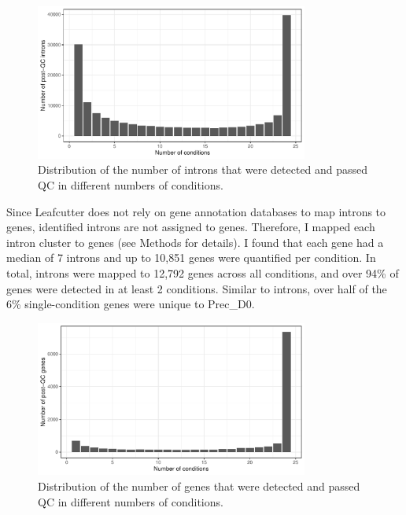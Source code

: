 \begin{figure}[H]
  \centering
  \includegraphics[width=0.8\textwidth]{dist_intron_num}
  \caption{Distribution of the number of introns that were detected and passed QC in different numbers of conditions.}
  \label{fig:dist_intron_num}   
\end{figure}
Since Leafcutter does not rely on gene annotation databases to map introns to genes, identified introns are not assigned to genes. Therefore, I mapped each intron cluster to genes (see Methods for details). I found that each gene had a median of 7 introns and up to 10,851 genes were quantified per condition. In total, introns were mapped to 12,792 genes across all conditions, and over 94\% of genes were detected in at least 2 conditions. Similar to introns, over half of the 6\% single-condition genes were unique to Prec\_D0.

\begin{figure}[H]
  \centering
  \includegraphics[width=0.8\textwidth]{dist_gene_num}
  \caption{Distribution of the number of genes that were detected and passed QC in different numbers of conditions.}
  \label{fig:dist_gene_num}   
\end{figure}

